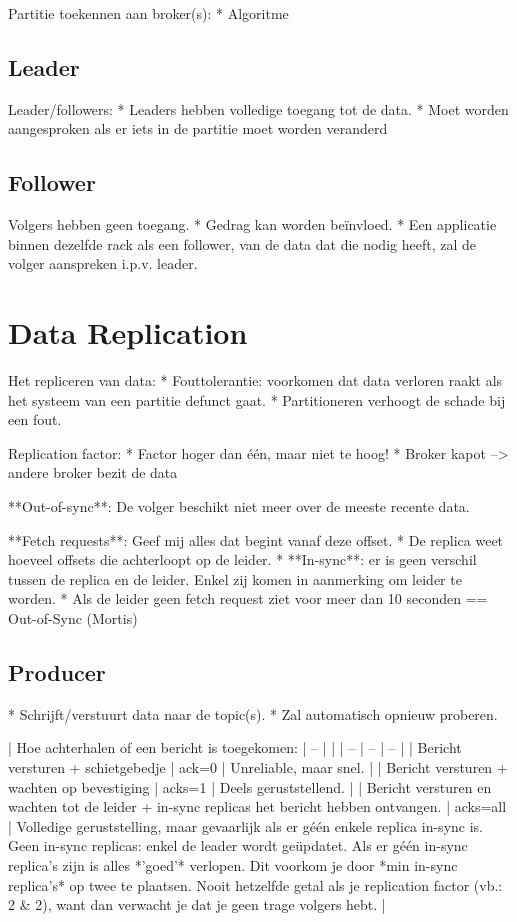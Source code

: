 \documentclass[a4paper,10pt,twoside]{report}
\begin{document}
Partitie toekennen aan broker(s):
* Algoritme

\subsection{Leader}

Leader/followers:
* Leaders hebben volledige toegang tot de data.
* Moet worden aangesproken als er iets in de partitie moet worden veranderd

\subsection{Follower}

Volgers hebben geen toegang. 
* Gedrag kan worden beïnvloed.
* Een applicatie binnen dezelfde rack als een follower, van de data dat die nodig heeft, zal de volger aanspreken i.p.v. leader.


\section{Data Replication}
Het repliceren van data:
* Fouttolerantie: voorkomen dat data verloren raakt als het systeem van een partitie defunct gaat.
* Partitioneren verhoogt de schade bij een fout.

Replication factor:
* Factor hoger dan één, maar niet te hoog!
* Broker kapot --> andere broker bezit de data

**Out-of-sync**: De volger beschikt niet meer over de meeste recente data.

**Fetch requests**: Geef mij alles dat begint vanaf deze offset.
* De replica weet hoeveel offsets die achterloopt op de leider.
* **In-sync**: er is geen verschil tussen de replica en de leider. Enkel zij komen in aanmerking om leider te worden.
* Als de leider geen fetch request ziet voor meer dan 10 seconden == Out-of-Sync (Mortis)

\subsection{Producer}
* Schrijft/verstuurt data naar de topic(s).
* Zal automatisch opnieuw proberen.

| Hoe achterhalen of een bericht is toegekomen: | -- | |
| -- | -- | -- |
| Bericht versturen + schietgebedje | ack=0 | Unreliable, maar snel. |
| Bericht versturen + wachten op bevestiging | acks=1 | Deels geruststellend. |
| Bericht versturen en wachten tot de leider + in-sync replicas het bericht hebben ontvangen. | acks=all | Volledige geruststelling, maar gevaarlijk als er géén enkele replica in-sync is. Geen in-sync replicas: enkel de leader wordt geüpdatet. Als er géén in-sync replica's zijn is alles *'goed'* verlopen. Dit voorkom je door *min in-sync replica's* op twee te plaatsen. Nooit hetzelfde getal als je replication factor (vb.: 2 & 2), want dan verwacht je dat je geen trage volgers hebt. |
\end{document}
